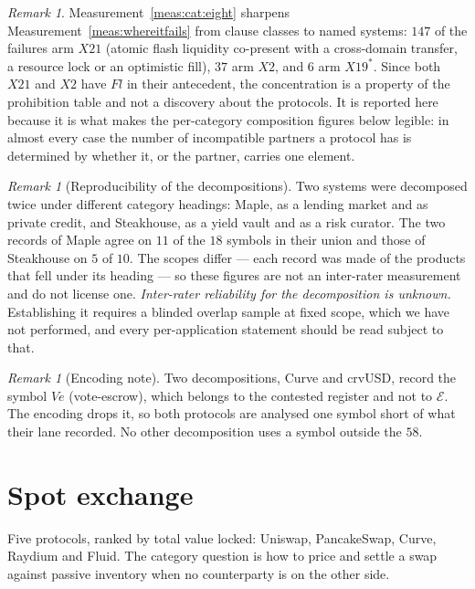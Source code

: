 \documentclass[11pt,reqno]{amsart}
\theoremstyle{plain}
\theoremstyle{definition}
\theoremstyle{remark}
\newtheorem{remark}[theorem]{Remark}
\newcommand{\El}{\mathcal{E}}
\begin{document}
\begin{remark}
Measurement~\ref{meas:cat:eight} sharpens Measurement~\ref{meas:whereitfails}
from clause classes to named systems: $147$ of the failures arm $X21$
(atomic flash liquidity co-present with a cross-domain transfer, a resource lock
or an optimistic fill), $37$ arm $X2$, and $6$ arm $X19^{*}$. Since both $X21$
and $X2$ have $Fl$ in their antecedent, the concentration is a property of the
prohibition table and not a discovery about the protocols. It is reported here
because it is what makes the per-category composition figures below legible: in
almost every case the number of incompatible partners a protocol has is
determined by whether it, or the partner, carries one element.
\end{remark}

\begin{remark}[Reproducibility of the decompositions]\label{rem:cat:repro}
Two systems were decomposed twice under different category headings: Maple, as
a lending market and as private credit, and Steakhouse, as a yield vault and as
a risk curator. The two records of Maple agree on $11$ of the $18$ symbols in
their union and those of Steakhouse on $5$ of $10$. The scopes differ --- each
record was made of the products that fell under its heading --- so these figures
are not an inter-rater measurement and do not license one. \emph{Inter-rater
reliability for the decomposition is unknown.} Establishing it requires a
blinded overlap sample at fixed scope, which we have not performed, and every
per-application statement should be read subject to that.
\end{remark}

\begin{remark}[Encoding note]
Two decompositions, Curve and crvUSD, record the symbol $Ve$ (vote-escrow),
which belongs to the contested register and not to $\El$. The encoding drops it,
so both protocols are analysed one symbol short of what their lane recorded. No
other decomposition uses a symbol outside the $58$.
\end{remark}

\section{Spot exchange}\label{sec:cat:dex}

Five protocols, ranked by total value locked: Uniswap, PancakeSwap, Curve,
Raydium and Fluid. The category question is how to price and settle a swap
against passive inventory when no counterparty is on the other side.
\end{document}
